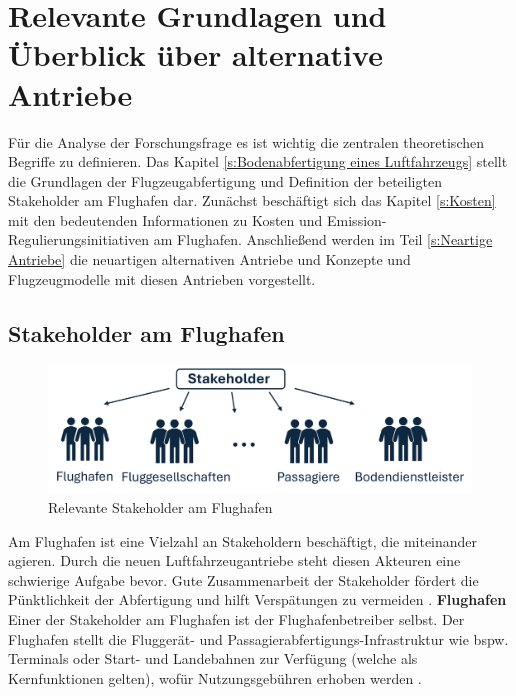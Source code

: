 \chapter{Relevante Grundlagen und Überblick über alternative Antriebe}
\label{ch:Relevante Grundlagen und Überblick über alternative Antriebe}
Für die Analyse der Forschungsfrage es ist wichtig die zentralen theoretischen Begriffe zu definieren. 
Das Kapitel \ref{s:Bodenabfertigung eines Luftfahrzeugs} stellt die Grundlagen der Flugzeugabfertigung und Definition
der beteiligten Stakeholder am Flughafen dar. Zunächst beschäftigt sich das Kapitel \ref{s:Kosten}
mit den bedeutenden Informationen zu Kosten und Emission-Regulierungsinitiativen am Flughafen. 
Anschließend werden im Teil \ref{s:Neartige Antriebe}
die neuartigen alternativen Antriebe und Konzepte und Flugzeugmodelle mit diesen Antrieben vorgestellt.

\section{Stakeholder am Flughafen}
\label{s:Stakeholder am Flughafen}
%
\begin{figure}[h]
	\centering
	\includegraphics[width=0.8\linewidth]{Bilder/Stakeholder.png}
	\caption[Relevante Stakeholder am Flughafen]{Relevante Stakeholder am Flughafen}
	\label{stakeholder}
\end{figure}

Am Flughafen ist eine Vielzahl an Stakeholdern beschäftigt, die miteinander agieren. 
Durch die neuen Luftfahrzeugantriebe steht diesen Akteuren eine schwierige Aufgabe bevor. 
Gute Zusammenarbeit der Stakeholder fördert die Pünktlichkeit der Abfertigung und 
hilft Verspätungen zu vermeiden \cite{schmidt2016challenges}.
%
\textbf{Flughafen} \\
Einer der Stakeholder am Flughafen ist der Flughafenbetreiber selbst. 
Der Flughafen stellt die Fluggerät- und Passagierabfertigungs-Infrastruktur wie bspw. 
Terminals oder Start- und Landebahnen zur Verfügung (welche als Kernfunktionen gelten), 
wofür Nutzungsgebühren erhoben werden \cite{conrady2019luftverkehr}. %

